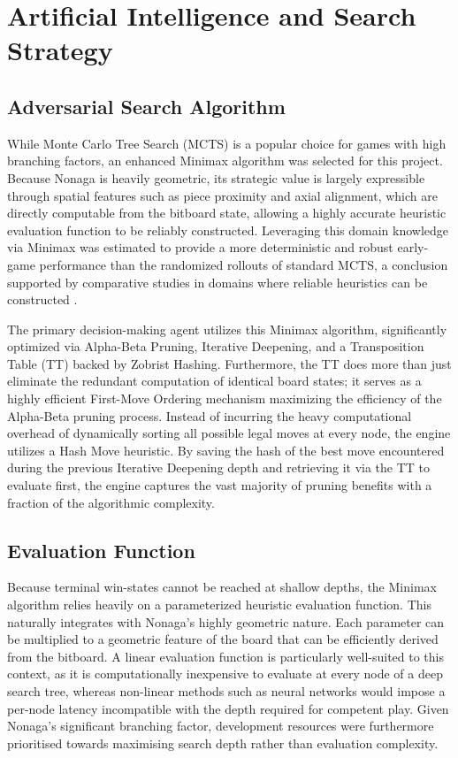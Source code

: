 \section{Artificial Intelligence and Search Strategy}
\label{sec:ai_search_strategy}

\subsection{Adversarial Search Algorithm}
\label{subsec:adversarial_search}
While Monte Carlo Tree Search (MCTS) is a popular choice for games with high branching factors, an enhanced Minimax algorithm was selected for this project. Because Nonaga is heavily geometric, its strategic value is largely expressible through spatial features such as piece proximity and axial alignment, which are directly computable from the bitboard state, allowing a highly accurate heuristic evaluation function to be reliably constructed. Leveraging this domain knowledge via Minimax was estimated to provide a more deterministic and robust early-game performance than the randomized rollouts of standard MCTS, a conclusion supported by comparative studies in domains where reliable heuristics can be constructed \cite{SA2020survey, MCTSminimax}.

The primary decision-making agent utilizes this Minimax algorithm, significantly optimized via Alpha-Beta Pruning, Iterative Deepening, and a Transposition Table (TT) backed by Zobrist Hashing. Furthermore, the TT does more than just eliminate the redundant computation of identical board states; it serves as a highly efficient First-Move Ordering mechanism maximizing the efficiency of the Alpha-Beta pruning process. Instead of incurring the heavy computational overhead of dynamically sorting all possible legal moves at every node, the engine utilizes a Hash Move heuristic. By saving the hash of the best move encountered during the previous Iterative Deepening depth and retrieving it via the TT to evaluate first, the engine captures the vast majority of pruning benefits with a fraction of the algorithmic complexity.

\subsection{Evaluation Function}
\label{subsec:evaluation_function}
Because terminal win-states cannot be reached at shallow depths, the Minimax algorithm relies heavily on a parameterized heuristic evaluation function. This naturally integrates with Nonaga's highly geometric nature. Each parameter can be multiplied to a geometric feature of the board that can be efficiently derived from the bitboard. A linear evaluation function \cite{shannon1950programming} is particularly well-suited to this context, as it is computationally inexpensive to evaluate at every node of a deep search tree, whereas non-linear methods such as neural networks would impose a per-node latency incompatible with the depth required for competent play. Given Nonaga's significant branching factor, development resources were furthermore prioritised towards maximising search depth rather than evaluation complexity.

